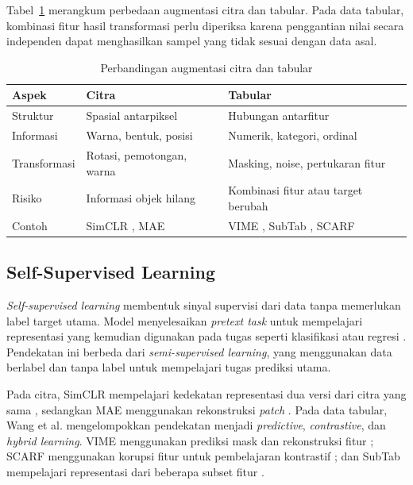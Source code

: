 Tabel~\ref{tab:i} merangkum perbedaan augmentasi citra dan tabular. Pada data tabular, kombinasi fitur hasil transformasi perlu diperiksa karena penggantian nilai secara independen dapat menghasilkan sampel yang tidak sesuai dengan data asal.

\begin{table}[!t]
\caption{Perbandingan augmentasi citra dan tabular}
\label{tab:i}
\centering
\footnotesize
\setlength{\tabcolsep}{3pt}
\renewcommand{\arraystretch}{1.1}
\begin{tabularx}{\columnwidth}{p{}XX}
\hline
\textbf{Aspek} & \textbf{Citra} & \textbf{Tabular} \\
\hline
Struktur & Spasial antarpiksel & Hubungan antarfitur \\
Informasi & Warna, bentuk, posisi & Numerik, kategori, ordinal \\
Transformasi & Rotasi, pemotongan, warna & Masking, noise, pertukaran fitur \\
Risiko & Informasi objek hilang & Kombinasi fitur atau target berubah \\
Contoh & SimCLR \cite{ref2}, MAE \cite{ref3} & VIME \cite{ref5}, SubTab \cite{ref6}, SCARF \cite{ref7} \\
\hline
\end{tabularx}
\end{table}

\subsection{Self-Supervised Learning}

\textit{Self-supervised learning} membentuk sinyal supervisi dari data tanpa memerlukan label target utama. Model menyelesaikan \textit{pretext task} untuk mempelajari representasi yang kemudian digunakan pada tugas seperti klasifikasi atau regresi \cite{ref4}. Pendekatan ini berbeda dari \textit{semi-supervised learning}, yang menggunakan data berlabel dan tanpa label untuk mempelajari tugas prediksi utama.

Pada citra, SimCLR mempelajari kedekatan representasi dua versi dari citra yang sama \cite{ref2}, sedangkan MAE menggunakan rekonstruksi \textit{patch} \cite{ref3}. Pada data tabular, Wang et al. \cite{ref4} mengelompokkan pendekatan menjadi \textit{predictive}, \textit{contrastive}, dan \textit{hybrid learning}. VIME menggunakan prediksi mask dan rekonstruksi fitur \cite{ref5}; SCARF menggunakan korupsi fitur untuk pembelajaran kontrastif \cite{ref7}; dan SubTab mempelajari representasi dari beberapa subset fitur \cite{ref6}.

